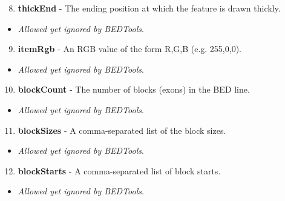 \documentclass[letterpaper,10pt,english]{sphinxmanual}
\begin{document}
\begin{enumerate}
\setcounter{enumi}{7}
\item {} 
\textbf{thickEnd} - The ending position at which the feature is drawn thickly.

\end{enumerate}
\begin{itemize}
\item {} 
\emph{Allowed yet ignored by BEDTools}.

\end{itemize}
\begin{enumerate}
\setcounter{enumi}{8}
\item {} 
\textbf{itemRgb} - An RGB value of the form R,G,B (e.g. 255,0,0).

\end{enumerate}
\begin{itemize}
\item {} 
\emph{Allowed yet ignored by BEDTools}.

\end{itemize}
\begin{enumerate}
\setcounter{enumi}{9}
\item {} 
\textbf{blockCount} - The number of blocks (exons) in the BED line.

\end{enumerate}
\begin{itemize}
\item {} 
\emph{Allowed yet ignored by BEDTools}.

\end{itemize}
\begin{enumerate}
\setcounter{enumi}{10}
\item {} 
\textbf{blockSizes} - A comma-separated list of the block sizes.

\end{enumerate}
\begin{itemize}
\item {} 
\emph{Allowed yet ignored by BEDTools}.

\end{itemize}
\begin{enumerate}
\setcounter{enumi}{11}
\item {} 
\textbf{blockStarts} - A comma-separated list of block starts.

\end{enumerate}
\begin{itemize}
\item {} 
\emph{Allowed yet ignored by BEDTools}.

\end{itemize}
\end{document}
